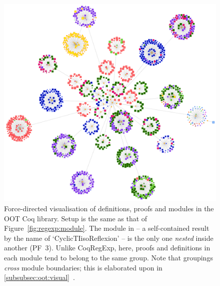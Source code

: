 \begin{figure}[tp]
\centering
\includegraphics[height=0.35\textheight]{img/oot/modules}
\caption{Force-directed visualisation of definitions, proofs and modules in
  the OOT Coq library. Setup is the same as that of
  Figure~\ref{fig:regexp:module}. The module in  --
  a self-contained result by the name of `CyclicTIisoReflexion' -- is
  the only one \emph{nested} inside another (PF~3). Unlike CoqRegExp, here,
  proofs and definitions in each module tend to belong to the same group. Note
  that groupings \emph{cross} module boundaries; this is elaborated upon in
  \ref{subsubsec:oot:visual}~.}\label{fig:oot:module}
\end{figure}

